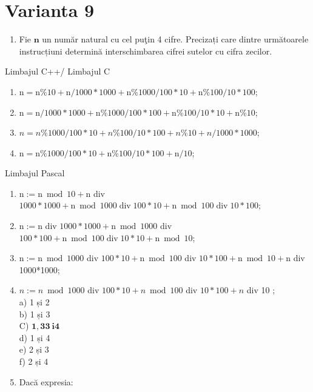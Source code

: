 \documentclass[10pt]{article}
\begin{document}
\section*{Varianta 9}
\begin{enumerate}
  \item Fie $\mathbf{n}$ un număr natural cu cel puţin 4 cifre. Precizați care dintre următoarele instrucțiuni determină interschimbarea cifrei sutelor cu cifra zecilor.
\end{enumerate}

Limbajul C++/ Limbajul C

\begin{enumerate}
  \item $\mathrm{n}=\mathrm{n} \% 10+\mathrm{n} / 1000 * 1000+\mathrm{n} \% 1000 / 100 * 10+\mathrm{n} \% 100 / 10 * 100$;
  \item $\mathrm{n}=\mathrm{n} / 1000 * 1000+\mathrm{n} \% 1000 / 100 * 100+\mathrm{n} \% 100 / 10 * 10+\mathrm{n} \% 10$;
  \item $n=n \% 1000 / 100 * 10+n \% 100 / 10 * 100+n \% 10+n / 1000 * 1000$;
  \item $\mathrm{n}=\mathrm{n} \% 1000 / 100 * 10+\mathrm{n} \% 100 / 10 * 100+\mathrm{n} / 10$;
\end{enumerate}

Limbajul Pascal

\begin{enumerate}
  \item $\mathrm{n}:=\mathrm{n} \bmod 10+\mathrm{n}$ div $1000 * 1000+\mathrm{n} \bmod 1000 \operatorname{div} 100 * 10+\mathrm{n} \bmod 100 \operatorname{div} 10 * 100 ;$
  \item $\mathrm{n}:=\mathrm{n}$ div $1000 * 1000+\mathrm{n} \bmod 1000$ div $100 * 100+\mathrm{n} \bmod 100 \operatorname{div} 10 * 10+\mathrm{n} \bmod 10$;
  \item $\mathrm{n}:=\mathrm{n} \bmod 1000$ div $100 * 10+\mathrm{n} \bmod 100$ div $10 * 100+\mathrm{n} \bmod 10+\mathrm{n}$ div 1000*1000;
  \item $n:=n \bmod 1000$ div $100 * 10+n \bmod 100$ div $10 * 100+n$ div 10 ;\\
a) 1 și 2\\
b) 1 și 3\\
C) $\mathbf{1 , 3} \mathbf{3} \mathbf{~ i} \mathbf{4}$\\
d) 1 și 4\\
e) 2 și 3\\
f) 2 și 4
  \item Dacă expresia:
\end{enumerate}
\end{document}
